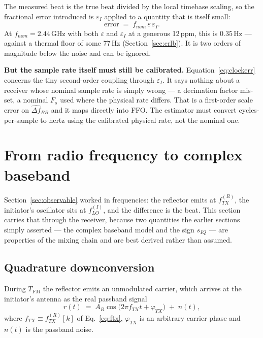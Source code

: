 \documentclass[11pt,a4paper]{article}
\newcommand{\Tfm}{T_{FM}}
\begin{document}
The measured beat is the true beat divided by the local timebase scaling, so the fractional error
introduced is $\varepsilon_I$ applied to a quantity that is itself small:
\begin{equation}
\text{error} \;=\; f_{nom}\,\varepsilon\,\varepsilon_I .
\label{eq:clockerr}
\end{equation}
At $f_{nom}=2.44$\,GHz with both $\varepsilon$ and $\varepsilon_I$ at a generous 12\,ppm, this is
$0.35$\,Hz --- against a thermal floor of some 77\,Hz (Section~\ref{sec:crlb}). It is two orders of
magnitude below the noise and can be ignored.

\begin{callout}
\textbf{But the sample rate itself must still be calibrated.} Equation~\eqref{eq:clockerr} concerns
the tiny second-order coupling through $\varepsilon_I$. It says nothing about a receiver whose
nominal sample rate is simply wrong --- a decimation factor mis-set, a nominal $F_s$ used where the
physical rate differs. That is a first-order scale error on $\widehat{\Delta f}_{BB}$ and it maps
directly into FFO. The estimator must convert cycles-per-sample to hertz using the calibrated
physical rate, not the nominal one.
\end{callout}
\section{From radio frequency to complex baseband}
\label{sec:window}

Section~\ref{sec:observable} worked in frequencies: the reflector emits at $f_{TX}^{(R)}$, the
initiator's oscillator sits at $f_{LO}^{(I)}$, and the difference is the beat. This section carries
that through the receiver, because two quantities the earlier sections simply asserted --- the
complex baseband model and the sign $s_{IQ}$ --- are properties of the mixing chain and are best
derived rather than assumed.

\subsection{Quadrature downconversion}
\label{sec:mixing}

During $\Tfm$ the reflector emits an unmodulated carrier, which arrives at the initiator's antenna as
the real passband signal
\begin{equation}
r(t) \;=\; A_R \cos\!\bigl(2\pi f_{TX} t + \varphi_{TX}\bigr) \;+\; n(t),
\label{eq:rf}
\end{equation}
where $f_{TX} \equiv f_{TX}^{(R)}[k]$ of Eq.~\eqref{eq:ftx}, $\varphi_{TX}$ is an arbitrary carrier
phase and $n(t)$ is the passband noise.
\end{document}

